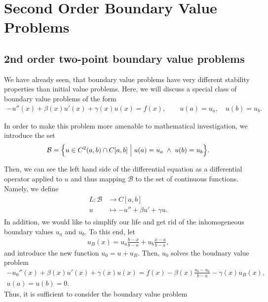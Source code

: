 \chapter{Second Order Boundary Value Problems}

\section{2nd order two-point boundary value problems}

\begin{intro}
  We have already seen, that boundary value problems have very
  different stability properties than initial value
  problems. Here, we will discuss a special class of boundary value
  problems of the form
  \begin{gather}
    \label{eq:bvp-second:1}
    -u''(x) + \beta(x) u'(x) + \gamma(x)u(x) = f(x),
    \qquad u(a) = u_a,
    \quad u(b) = u_b.
  \end{gather}

  In order to make this problem more amenable to mathematical
  investigation, we introduce the set
  \begin{gather*}
    \mathcal B =
    \Bigl\{ u\in C^2(a,b) \cap C[a,b]
    \;\Big|\; u(a) = u_a\;\wedge\; u(b) = u_b
    \Bigr\}.
  \end{gather*}

  Then, we can see the left hand side of the differential equation as
  a differential operator applied to $u$ and thus mapping $\mathcal B$
  to the set of continuous functions. Namely, we define
  \begin{gather}
    \label{eq:fd:2}
    \begin{split}
      L: \mathcal B &\to C[a,b] \\
      u & \mapsto -u'' + \beta u' + \gamma u.
    \end{split}
  \end{gather}
  In addition, we would like to simplify our life and get rid of the
  inhomogeneous boundary values $u_a$ and $u_b$. To this end, let
  \begin{gather*}
    u_B(x) = u_a \frac{b-x}{b-a} + u_b \frac{x-a}{b-a},
  \end{gather*}
  and introduce the new function $u_0 = u+u_B$. Then, $u_0$ solves
  the boudnary value problem
  \begin{multline*}
    -u_0''(x) + \beta(x) u'(x) + \gamma(x)u(x) = f(x) -
    \beta(x)\frac{u_b-u_a}{b-a} - \gamma(x)u_B(x),
    \\ u(a) =  u(b) = 0.
  \end{multline*}
  Thus, it is sufficient to consider the boundary value problem
\end{intro}

